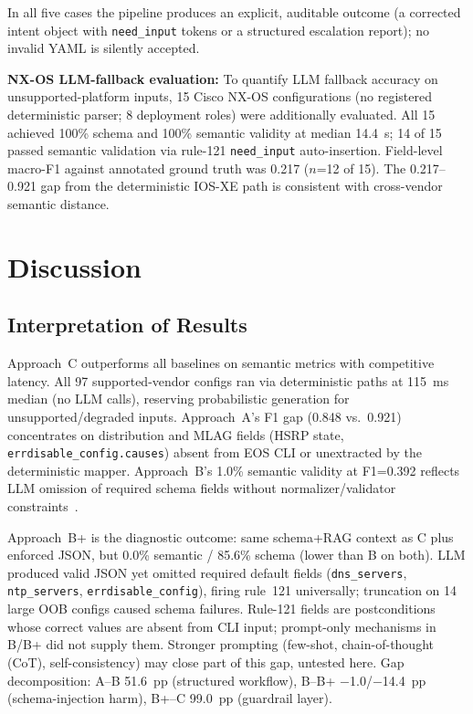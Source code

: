 \documentclass[conference]{IEEEtran}
\begin{document}
In all five cases the pipeline produces an explicit, auditable outcome (a corrected intent object with \texttt{need\_input} tokens or a structured escalation report); no invalid YAML is silently accepted.

\textbf{NX-OS LLM-fallback evaluation:} To quantify LLM fallback accuracy on unsupported-platform inputs, 15 Cisco NX-OS configurations (no registered deterministic parser; 8 deployment roles) were additionally evaluated. All 15 achieved 100\% schema and 100\% semantic validity at median 14.4~s; 14 of 15 passed semantic validation via rule-121 \texttt{need\_input} auto-insertion. Field-level macro-F1 against annotated ground truth was 0.217 ($n$=12 of 15). The 0.217--0.921 gap from the deterministic IOS-XE path is consistent with cross-vendor semantic distance.

\section{Discussion}

\subsection{Interpretation of Results}

Approach~C outperforms all baselines on semantic metrics with competitive latency. All 97 supported-vendor configs ran via deterministic paths at 115~ms median (no LLM calls), reserving probabilistic generation for unsupported/degraded inputs. Approach~A's F1 gap (0.848 vs.~0.921) concentrates on distribution and MLAG fields (HSRP state, \texttt{errdisable\_config.causes}) absent from EOS CLI or unextracted by the deterministic mapper. Approach~B's 1.0\% semantic validity at F1=0.392 reflects LLM omission of required schema fields without normalizer/validator constraints~\cite{wu2024netllm,mondal2023router}.

Approach~B+ is the diagnostic outcome: same schema+RAG context as C plus enforced JSON, but 0.0\% semantic / 85.6\% schema (lower than B on both). LLM produced valid JSON yet omitted required default fields (\texttt{dns\_servers}, \texttt{ntp\_servers}, \texttt{errdisable\_config}), firing rule~121 universally; truncation on 14 large OOB configs caused schema failures. Rule-121 fields are postconditions whose correct values are absent from CLI input; prompt-only mechanisms in B/B+ did not supply them. Stronger prompting (few-shot, chain-of-thought (CoT), self-consistency) may close part of this gap, untested here. Gap decomposition: A--B 51.6~pp (structured workflow), B--B+ $-$1.0/$-$14.4~pp (schema-injection harm), B+--C 99.0~pp (guardrail layer).
\end{document}
